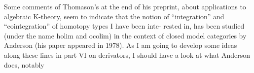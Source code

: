     Some comments of Thomason's at the end of his preprint,  about
applications to algebraic K-theory,  seem to indicate that the notion
of ``integration'' and ``cointegration'' of homotopy types I have been inte-%
rested in,  has been studied (under the name holim and ocolim) in the
context of closed model categories by Anderson  (his paper appeared in
1978).   As I am going to develop some ideas along these lines in part VI
on derivators,  I should have a look at what Anderson does,  notably

